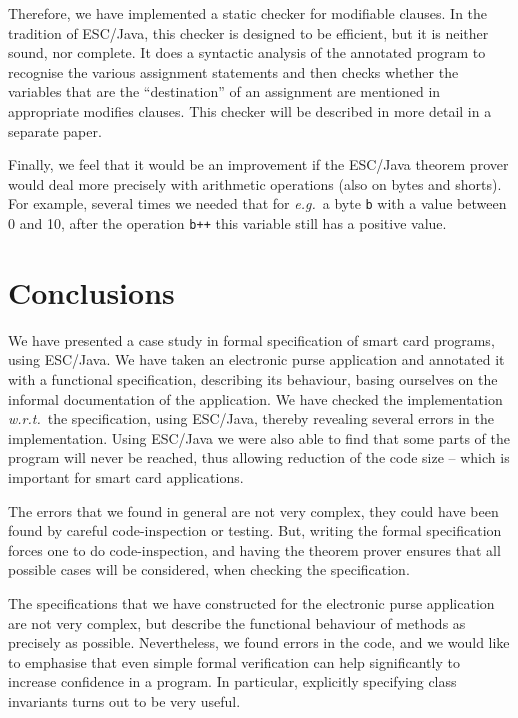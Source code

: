 \documentclass[a4paper]{llncs}
\begin{document}
Therefore, we have implemented a static checker for modifiable
clauses. In the tradition of ESC/Java, this checker is designed to be
efficient, but it is neither sound, nor complete. It does a syntactic
analysis of the annotated program to recognise the various assignment
statements and then checks whether the variables that are the
``destination'' of an assignment are mentioned in appropriate modifies
clauses. This checker will be described in more detail in a separate
paper.


Finally, we feel that it would be an improvement if the ESC/Java
theorem prover would deal more precisely with arithmetic operations
(also on bytes and shorts). For example, several times we needed that
for \emph{e.g.}~a byte \texttt{b} with a value between 0 and 10, after
the operation \texttt{b++} this variable still has a positive value.


\section{Conclusions}
\label{SectConcl}

We have presented a case study in formal specification of smart card
programs, using ESC/Java. We have taken an electronic purse
application and annotated it with a functional specification,
describing its behaviour, basing ourselves on the informal
documentation of the application. We have checked the implementation
\emph{w.r.t.}~the specification, using ESC/Java, thereby revealing
several errors in the implementation. Using ESC/Java we were also able 
to find that some parts of the program will never be reached, thus
allowing reduction of the code size -- which is important for smart
card applications. 

The errors that we found in general are not very complex, they could
have been found by careful code-inspection or testing. But, writing
the formal specification forces one to do code-inspection, and having
the theorem prover ensures that all possible cases will be
considered, when checking the specification.

The specifications that we have constructed for the electronic purse
application are not very complex, but describe the functional
behaviour of methods as precisely as possible. Nevertheless, we found
errors in the code, and we would like to emphasise that even simple
formal verification can help significantly to increase confidence in a
program. In particular, explicitly specifying class invariants turns
out to be very useful.
\end{document}
